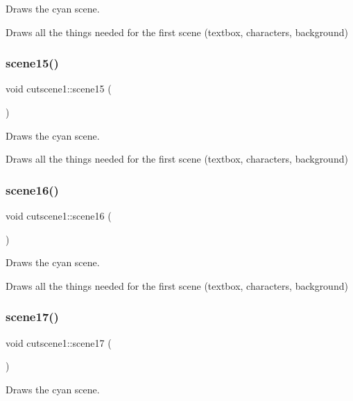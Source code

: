 Draws the cyan scene. 

Draws all the things needed for the first scene (textbox, characters, background) \mbox{\label{classcutscene1_a2e175a494e93ec627d314f6372a6578c}} 
\subsubsection{\texorpdfstring{scene15()}{scene15()}}
{\footnotesize\ttfamily void cutscene1\+::scene15 (\begin{DoxyParamCaption}{ }\end{DoxyParamCaption})}



Draws the cyan scene. 

Draws all the things needed for the first scene (textbox, characters, background) \mbox{\label{classcutscene1_a4a414fd614b2d835107d9d8713d1e539}} 
\subsubsection{\texorpdfstring{scene16()}{scene16()}}
{\footnotesize\ttfamily void cutscene1\+::scene16 (\begin{DoxyParamCaption}{ }\end{DoxyParamCaption})}



Draws the cyan scene. 

Draws all the things needed for the first scene (textbox, characters, background) \mbox{\label{classcutscene1_a9706ac15030f2831ecf326894a5031c5}} 
\subsubsection{\texorpdfstring{scene17()}{scene17()}}
{\footnotesize\ttfamily void cutscene1\+::scene17 (\begin{DoxyParamCaption}{ }\end{DoxyParamCaption})}



Draws the cyan scene. 

